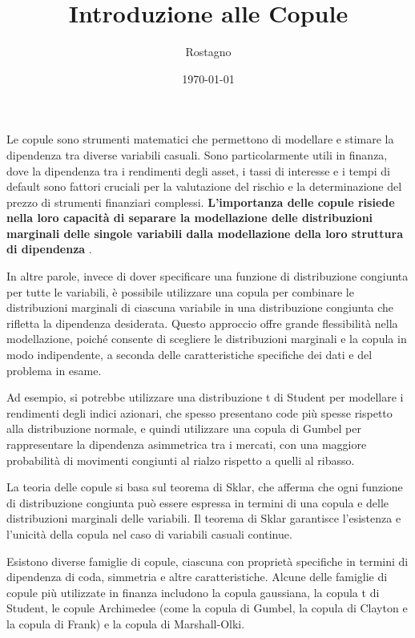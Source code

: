 \documentclass[a4paper,12pt]{article}
\begin{document}
	\title{\textbf{Introduzione alle Copule}}
	\author{Rostagno}
	\date{\today}
	\maketitle

\noindent Le copule sono strumenti matematici che permettono di modellare e stimare la dipendenza tra diverse variabili casuali. Sono particolarmente utili in finanza, dove la dipendenza tra i rendimenti degli asset, i tassi di interesse e i tempi di default sono fattori cruciali per la valutazione del rischio e la determinazione del prezzo di strumenti finanziari complessi. \textbf{L'importanza delle copule risiede nella loro capacità di separare la modellazione delle distribuzioni marginali delle singole variabili dalla modellazione della loro struttura di dipendenza} .

\noindent In altre parole, invece di dover specificare una funzione di distribuzione congiunta per tutte le variabili, è possibile utilizzare una copula per combinare le distribuzioni marginali di ciascuna variabile in una distribuzione congiunta che rifletta la dipendenza desiderata. Questo approccio offre grande flessibilità nella modellazione, poiché consente di scegliere le distribuzioni marginali e la copula in modo indipendente, a seconda delle caratteristiche specifiche dei dati e del problema in esame.

\noindent Ad esempio, si potrebbe utilizzare una distribuzione t di Student per modellare i rendimenti degli indici azionari, che spesso presentano code più spesse rispetto alla distribuzione normale, e quindi utilizzare una copula di Gumbel per rappresentare la dipendenza asimmetrica tra i mercati, con una maggiore probabilità di movimenti congiunti al rialzo rispetto a quelli al ribasso. 

\noindent La teoria delle copule si basa sul teorema di Sklar, che afferma che ogni funzione di distribuzione congiunta può essere espressa in termini di una copula e delle distribuzioni marginali delle variabili. Il teorema di Sklar garantisce l'esistenza e l'unicità della copula nel caso di variabili casuali continue.

\noindent Esistono diverse famiglie di copule, ciascuna con proprietà specifiche in termini di dipendenza di coda, simmetria e altre caratteristiche. Alcune delle famiglie di copule più utilizzate in finanza includono la copula gaussiana, la copula t di Student, le copule Archimedee (come la copula di Gumbel, la copula di Clayton e la copula di Frank) e la copula di Marshall-Olki.
\end{document}
